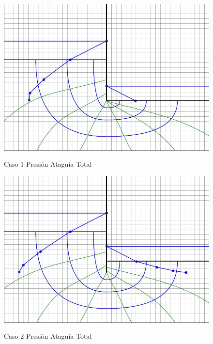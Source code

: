 \begin{figure}[H]
    \centering
    \begin{minipage}{0.32\textwidth}
        \centering
        \includegraphics[width=\textwidth]{GRAFICOS/caso_1_presion_ataguia_total.jpg}
        \caption{Caso 1 Presión Ataguía Total}
        \label{fig:caso_1_presion_ataguia_total}
    \end{minipage}
    \begin{minipage}{0.32\textwidth}
        \centering
        \includegraphics[width=\textwidth]{GRAFICOS/caso_2_presion_ataguia_total.jpg}
        \caption{Caso 2 Presión Ataguía Total}
        \label{fig:caso_2_presion_ataguia_total}
    \end{minipage}

\end{figure}
